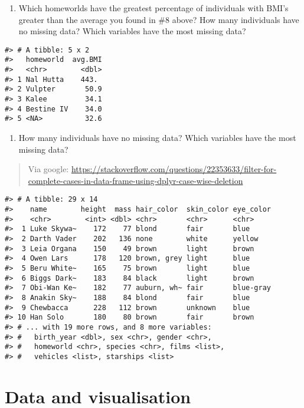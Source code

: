 \documentclass[
]{book}
\providecommand{\tightlist}{%
  \setlength{\itemsep}{0pt}\setlength{\parskip}{0pt}}
\theoremstyle{definition}
\theoremstyle{definition}
\theoremstyle{definition}
\theoremstyle{definition}
\theoremstyle{remark}
\begin{document}
\begin{enumerate}
\def\labelenumi{\arabic{enumi}.}
\setcounter{enumi}{8}
\tightlist
\item
  Which homeworlds have the greatest percentage of individuals with BMI's greater than the average you found in \#8 above?
  How many individuals have no missing data? Which variables have the most missing data?
\end{enumerate}

\begin{verbatim}
#> # A tibble: 5 x 2
#>   homeworld  avg.BMI
#>   <chr>        <dbl>
#> 1 Nal Hutta    443. 
#> 2 Vulpter       50.9
#> 3 Kalee         34.1
#> 4 Bestine IV    34.0
#> 5 <NA>          32.6
\end{verbatim}

\begin{enumerate}
\def\labelenumi{\arabic{enumi}.}
\setcounter{enumi}{9}
\tightlist
\item
  How many individuals have no missing data? Which variables have the most missing data?
\end{enumerate}

\begin{quote}
Via google: \url{https://stackoverflow.com/questions/22353633/filter-for-complete-cases-in-data-frame-using-dplyr-case-wise-deletion}
\end{quote}

\begin{verbatim}
#> # A tibble: 29 x 14
#>    name        height  mass hair_color  skin_color eye_color
#>    <chr>        <int> <dbl> <chr>       <chr>      <chr>    
#>  1 Luke Skywa~    172    77 blond       fair       blue     
#>  2 Darth Vader    202   136 none        white      yellow   
#>  3 Leia Organa    150    49 brown       light      brown    
#>  4 Owen Lars      178   120 brown, grey light      blue     
#>  5 Beru White~    165    75 brown       light      blue     
#>  6 Biggs Dark~    183    84 black       light      brown    
#>  7 Obi-Wan Ke~    182    77 auburn, wh~ fair       blue-gray
#>  8 Anakin Sky~    188    84 blond       fair       blue     
#>  9 Chewbacca      228   112 brown       unknown    blue     
#> 10 Han Solo       180    80 brown       fair       brown    
#> # ... with 19 more rows, and 8 more variables:
#> #   birth_year <dbl>, sex <chr>, gender <chr>,
#> #   homeworld <chr>, species <chr>, films <list>,
#> #   vehicles <list>, starships <list>
\end{verbatim}

\hypertarget{data-and-visualisation-1}{%
\chapter{Data and visualisation}\label{data-and-visualisation-1}}
\end{document}
